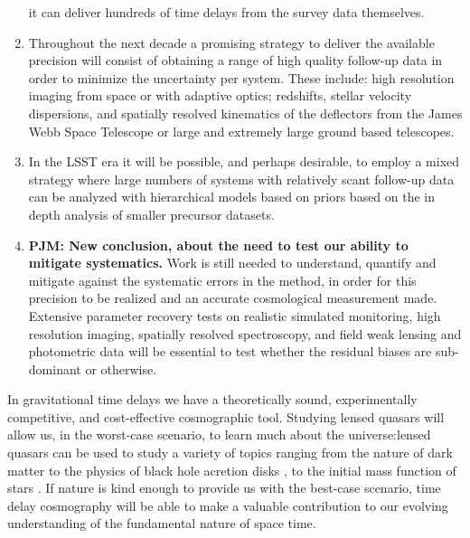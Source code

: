 \begin{enumerate}
it can deliver hundreds of time delays from the survey data themselves.
\item Throughout the next decade a promising strategy to deliver the
available precision will consist of obtaining a
range of high quality follow-up data in order to minimize the
uncertainty per system. These include: high resolution imaging from
space or with adaptive optics; redshifts, stellar velocity dispersions,
and spatially resolved kinematics of the deflectors from the James Webb
Space Telescope or large and extremely large ground based telescopes.
\item  In the LSST era it will be possible, and perhaps desirable,  to
employ a mixed strategy where large numbers of systems with relatively
scant follow-up data can be analyzed with hierarchical models based on
priors based on the in depth analysis of smaller precursor datasets.
\item {\bf PJM: New conclusion, about the need to test our ability to
mitigate systematics.} Work is still needed to understand, quantify and
mitigate against the systematic errors in  the method, in order for this
precision to be realized and an accurate cosmological measurement made.
Extensive parameter recovery tests on realistic simulated monitoring,
high resolution imaging, spatially resolved spectroscopy, and field weak
lensing and photometric data will be essential to test whether the
residual biases are sub-dominant or otherwise.
\end{enumerate}


%
%
In gravitational time delays we have a theoretically sound,
experimentally competitive, and cost-effective cosmographic tool.
%
Studying lensed
quasars will allow us, in the worst-case scenario, to learn much about
the universe:lensed quasars can be used to study a variety of topics
ranging from the nature of dark matter
\citep{Metcalf:2005p1203,Xu++09,Veg++14,Nie++14} to the physics of
black hole acretion disks \citep{PMK08,Blackburne:2010p6600}, to the
initial mass function of stars \citep{Sch++14}. If nature is kind
enough to provide us with the best-case scenario, time delay cosmography
will be able to
make a valuable contribution to our evolving understanding of the
fundamental nature of space time.
